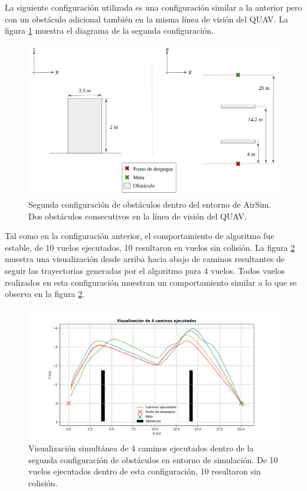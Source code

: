 La siguiente configuración utilizada es una configuración similar a la anterior pero con un obstáculo adicional también en la misma línea de visión del QUAV. La figura \ref{fig:config-2-double} muestra el diagrama de la segunda configuración.

\begin{figure}[H]
    \centering
    \includegraphics[scale=0.35]{partes/img/config-2-double.png}
    \caption[Segunda configuración de obstáculos dentro del entorno de AirSim.]{Segunda configuración de obstáculos dentro del entorno de AirSim. Dos obstáculos consecutivos en la línea de visión del QUAV.}
    \label{fig:config-2-double}
\end{figure}

Tal como en la configuración anterior, el comportamiento de algoritmo fue estable, de 10 vuelos ejecutados, 10 resultaron en vuelos sin colisión. La figura \ref{fig:double-graph-4} muestra una visualización desde arriba hacia abajo de caminos resultantes de seguir las trayectorias generadas por el algoritmo para 4 vuelos. Todos vuelos realizados en esta configuración muestran un comportamiento similar a lo que se observa en la figura \ref{fig:double-graph-4}.

\begin{figure}[H]
    \centering
    \includegraphics[scale=0.5]{partes/img/sim-double-panel-graph-4.png}
    \caption[Visualización simultánea de 4 caminos ejecutados dentro de la segunda configuración de obstáculos en entorno de simulación.]{Visualización simultánea de 4 caminos ejecutados dentro de la segunda configuración de obstáculos en entorno de simulación. De 10 vuelos ejecutados dentro de esta configuración, 10 resultaron sin colisión.}
    \label{fig:double-graph-4}
\end{figure}

